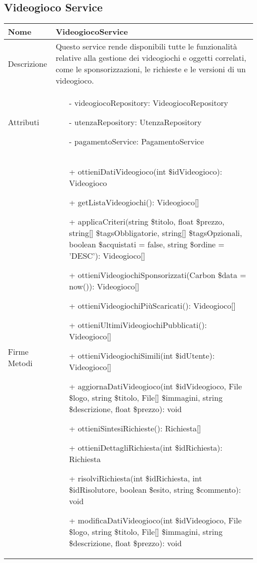 \newpage
\subsection{Videogioco Service}
\small\begin{tabular}{|| l | p{28em} ||} 
	\hline
	Nome & VideogiocoService\\
	\hline
	Descrizione & Questo service rende disponibili tutte le funzionalità relative alla gestione dei videogiochi e oggetti correlati, come le sponsorizzazioni, le richieste e le versioni di un videogioco. \\
	\hline
	Attributi & \begin{itemize}
		\item[-] videogiocoRepository: VideogiocoRepository
		\item[-] utenzaRepository: UtenzaRepository
		\item[-] pagamentoService: PagamentoService 
	\end{itemize}\\
	\hline
	Firme Metodi & \begin{itemize}
		\item[+] ottieniDatiVideogioco(int \$idVideogioco): Videogioco
		\item[+] getListaVideogiochi(): Videogioco[]
		\item[+] applicaCriteri(string \$titolo, float \$prezzo, string[] \$tagsObbligatorie, string[] \$tagsOpzionali, boolean \$acquistati = false, string \$ordine = 'DESC'): Videogioco[]
		\item[+] ottieniVideogiochiSponsorizzati(Carbon \$data = now()): Videogioco[]
		\item[+] ottieniVideogiochiPiùScaricati(): Videogioco[]
		\item[+] ottieniUltimiVideogiochiPubblicati(): Videogioco[]
		\item[+] ottieniVideogiochiSimili(int \$idUtente): Videogioco[]
		\item[+] aggiornaDatiVideogioco(int \$idVideogioco, File \$logo, string \$titolo, File[] \$immagini, string \$descrizione, float \$prezzo): void
		\item[+] ottieniSintesiRichieste(): Richiesta[]
		\item[+] ottieniDettagliRichiesta(int \$idRichiesta): Richiesta
		\item[+] risolviRichiesta(int \$idRichiesta, int \$idRisolutore, boolean \$esito, string \$commento): void
		\item[+] modificaDatiVideogioco(int \$idVideogioco, File \$logo, string \$titolo, File[] \$immagini, string \$descrizione, float \$prezzo): void

\end{itemize}
\end{tabular}
